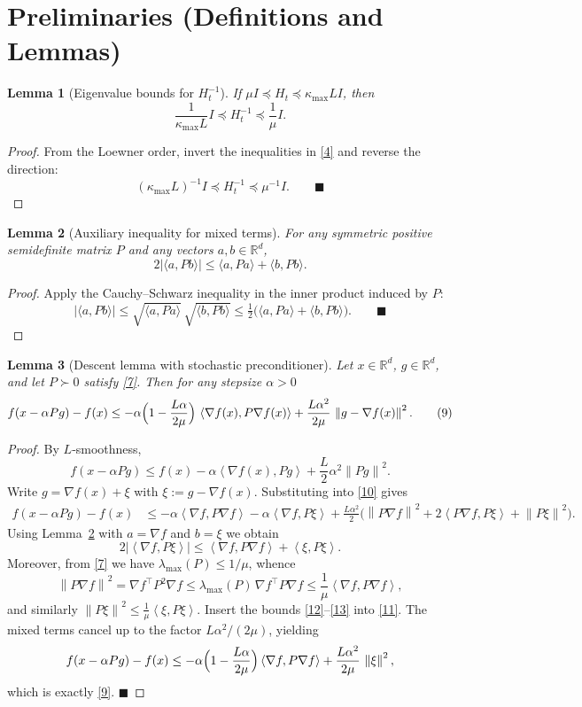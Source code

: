 \documentclass{article}
\newtheorem{lemma}{Lemma}
\newcommand{\norm}[1]{\left\lVert#1\right\rVert}
\newcommand{\ip}[2]{\left\langle #1,#2\right\rangle}
\newcommand{\R}{\mathbb{R}}
\newcommand{\grad}{\nabla}
\begin{document}
\newpage
\section*{Preliminaries (Definitions and Lemmas)}
\begin{lemma}[Eigenvalue bounds for $H_t^{-1}$]\label{lem:eig}
If $\mu I \preceq H_t \preceq \kappa_{\max} L I$, then
\[
\frac{1}{\kappa_{\max}L} I \preceq H_t^{-1} \preceq \frac{1}{\mu} I .
\tag{7}
\]
\end{lemma}
\begin{proof}
From the Loewner order, invert the inequalities in \eqref{4} and reverse the direction:
\[
(\kappa_{\max} L)^{-1} I \preceq H_t^{-1} \preceq \mu^{-1} I .
\qquad\blacksquare
\]
\end{proof}

\begin{lemma}[Auxiliary inequality for mixed terms]\label{lem:mixed}
For any symmetric positive semidefinite matrix $P$ and any vectors $a,b\in\R^d$,
\[
2\big|\langle a,Pb\rangle\big|\le \langle a,Pa\rangle+\langle b,Pb\rangle .
\tag{8}
\]
\end{lemma}
\begin{proof}
Apply the Cauchy–Schwarz inequality in the inner product induced by $P$:
\[
|\langle a,Pb\rangle| \le \sqrt{\langle a,Pa\rangle}\,\sqrt{\langle b,Pb\rangle}
\le \tfrac12\big(\langle a,Pa\rangle+\langle b,Pb\rangle\big).
\qquad\blacksquare
\]
\end{proof}

\begin{lemma}[Descent lemma with stochastic preconditioner]\label{lem:descent}
Let $x\in\R^d$, $g\in\R^d$, and let $P\succ0$ satisfy \eqref{7}. Then for any stepsize $\alpha>0$
\[
f(x-\alpha Pg)-f(x)
\le -\alpha\Bigl(1-\frac{L\alpha}{2\mu}\Bigr)\,
\ip{\grad f(x)}{P\grad f(x)}
+\frac{L\alpha^{2}}{2\mu}\,\norm{g-\grad f(x)}^{2}.
\tag{9}
\]
\end{lemma}
\begin{proof}
By $L$‑smoothness,
\[
f(x-\alpha Pg)\le f(x)-\alpha\ip{\grad f(x)}{Pg}
+\frac{L}{2}\alpha^{2}\norm{Pg}^{2}.
\tag{10}
\]
Write $g=\grad f(x)+\xi$ with $\xi:=g-\grad f(x)$. Substituting into \eqref{10} gives
\[
\begin{aligned}
f(x-\alpha Pg)-f(x)
&\le -\alpha\ip{\grad f}{P\grad f}
-\alpha\ip{\grad f}{P\xi}
+\frac{L\alpha^{2}}{2}\bigl(\norm{P\grad f}^{2}
+2\ip{P\grad f}{P\xi}
+\norm{P\xi}^{2}\bigr).
\end{aligned}
\tag{11}
\]
Using Lemma~\ref{lem:mixed} with $a=\grad f$ and $b=\xi$ we obtain
\[
2\big|\ip{\grad f}{P\xi}\big|\le
\ip{\grad f}{P\grad f}+\ip{\xi}{P\xi}.
\tag{12}
\]
Moreover, from \eqref{7} we have $\lambda_{\max}(P)\le 1/\mu$, whence
\[
\norm{P\grad f}^{2}= \grad f^{\!\top}P^{2}\grad f
\le \lambda_{\max}(P)\,\grad f^{\!\top}P\grad f
\le \frac{1}{\mu}\ip{\grad f}{P\grad f},
\tag{13}
\]
and similarly $\norm{P\xi}^{2}\le \frac{1}{\mu}\ip{\xi}{P\xi}$.
Insert the bounds \eqref{12}–\eqref{13} into \eqref{11}. The mixed terms cancel up to the factor
$L\alpha^{2}/(2\mu)$, yielding
\[
f(x-\alpha Pg)-f(x)
\le -\alpha\Bigl(1-\frac{L\alpha}{2\mu}\Bigr)\ip{\grad f}{P\grad f}
+\frac{L\alpha^{2}}{2\mu}\,\norm{\xi}^{2},
\]
which is exactly \eqref{9}. $\blacksquare$
\end{proof}
\end{document}
